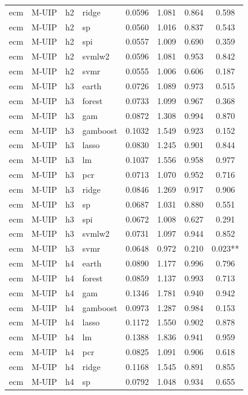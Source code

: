 \begin{ThreePartTable}
\begin{longtable}[t]{llclcccc}
ecm & M-UIP & h2 & ridge & 0.0596 & 1.081 & 0.864 & 0.598\\
ecm & M-UIP & h2 & sp & 0.0560 & 1.016 & 0.837 & 0.543\\
ecm & M-UIP & h2 & spi & 0.0557 & 1.009 & 0.690 & 0.359\\
ecm & M-UIP & h2 & svmlw2 & 0.0596 & 1.081 & 0.953 & 0.842\\
ecm & M-UIP & h2 & svmr & 0.0555 & 1.006 & 0.606 & 0.187\\
\addlinespace
ecm & M-UIP & h3 & earth & 0.0726 & 1.089 & 0.973 & 0.515\\
ecm & M-UIP & h3 & forest & 0.0733 & 1.099 & 0.967 & 0.368\\
ecm & M-UIP & h3 & gam & 0.0872 & 1.308 & 0.994 & 0.870\\
ecm & M-UIP & h3 & gamboost & 0.1032 & 1.549 & 0.923 & 0.152\\
ecm & M-UIP & h3 & lasso & 0.0830 & 1.245 & 0.901 & 0.844\\
ecm & M-UIP & h3 & lm & 0.1037 & 1.556 & 0.958 & 0.977\\
ecm & M-UIP & h3 & pcr & 0.0713 & 1.070 & 0.952 & 0.716\\
ecm & M-UIP & h3 & ridge & 0.0846 & 1.269 & 0.917 & 0.906\\
ecm & M-UIP & h3 & sp & 0.0687 & 1.031 & 0.880 & 0.551\\
ecm & M-UIP & h3 & spi & 0.0672 & 1.008 & 0.627 & 0.291\\
ecm & M-UIP & h3 & svmlw2 & 0.0731 & 1.097 & 0.944 & 0.852\\
ecm & M-UIP & h3 & svmr & 0.0648 & 0.972 & 0.210 & 0.023**\\
\addlinespace
ecm & M-UIP & h4 & earth & 0.0890 & 1.177 & 0.996 & 0.796\\
ecm & M-UIP & h4 & forest & 0.0859 & 1.137 & 0.993 & 0.713\\
ecm & M-UIP & h4 & gam & 0.1346 & 1.781 & 0.940 & 0.942\\
ecm & M-UIP & h4 & gamboost & 0.0973 & 1.287 & 0.984 & 0.153\\
ecm & M-UIP & h4 & lasso & 0.1172 & 1.550 & 0.902 & 0.878\\
ecm & M-UIP & h4 & lm & 0.1388 & 1.836 & 0.941 & 0.959\\
ecm & M-UIP & h4 & pcr & 0.0825 & 1.091 & 0.906 & 0.618\\
ecm & M-UIP & h4 & ridge & 0.1168 & 1.545 & 0.891 & 0.855\\
ecm & M-UIP & h4 & sp & 0.0792 & 1.048 & 0.934 & 0.655\\

\end{longtable}
\end{ThreePartTable}
